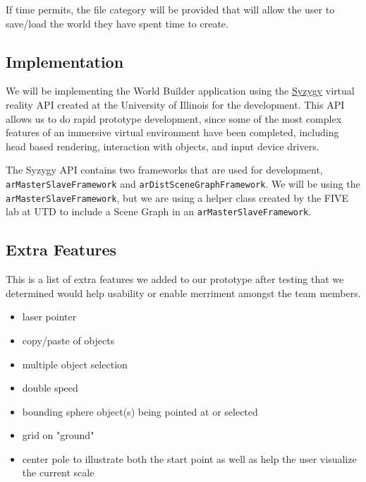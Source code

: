If time permits, the file category will be provided that will allow the user to save/load the world they have spent time to create.

\subsection{Implementation}
We will be implementing the World Builder application using the \href{http://syzygy.isl.uiuc.edu/szg/szgsrc/doc/index.html}{Syzygy} virtual reality API created at the University of Illinois for the development.
This API allows us to do rapid prototype development, since some of the most complex features of an immersive virtual environment have been completed, including head based rendering, interaction with objects, and input device drivers.

The Syzygy API contains two frameworks that are used for development, \verb|arMasterSlaveFramework| and \verb|arDistSceneGraphFramework|.
We will be using the \verb|arMasterSlaveFramework|, but we are using a helper class created by the FIVE lab at UTD to include a Scene Graph in an \verb|arMasterSlaveFramework|.

\subsection{Extra Features}
This is a list of extra features we added to our prototype after testing that we determined would help usability or enable merriment amongst the team members.

\begin{itemize}
    \item laser pointer
    \item copy/paste of objects
    \item multiple object selection
    \item double speed
    \item bounding sphere object(s) being pointed at or selected
    \item grid on "ground"
    \item center pole to illustrate both the start point as well as help the user visualize the current scale
\end{itemize}

